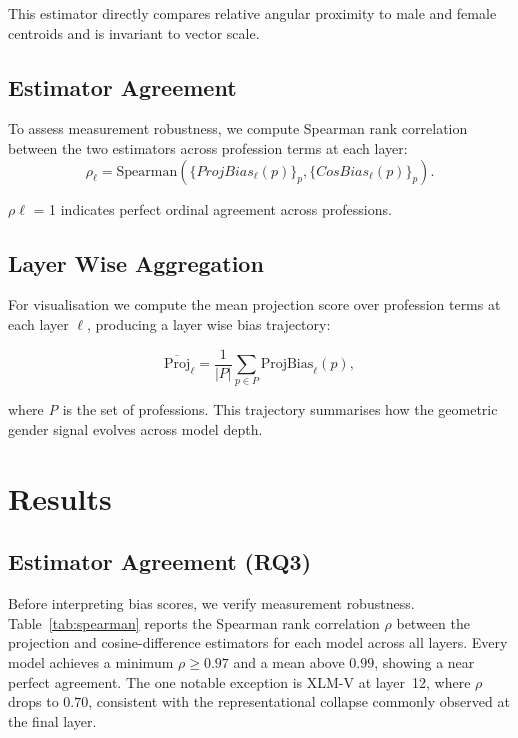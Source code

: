 \documentclass[english, a4paper, 11.5pt, twoside]{article}
\begin{document}
This estimator directly compares relative angular proximity to male and female centroids and is invariant
to vector scale.


\subsection{Estimator Agreement}
To assess measurement robustness, we compute Spearman rank correlation \parencite{Spearman:1904} between the two estimators across profession terms at each layer:
\begin{equation}
\rho_\ell = \text{Spearman}(\{ProjBias_\ell(p)\}_p, \{CosBias_\ell(p)\}_p).
\end{equation}

$\rho\ell$ = 1 indicates perfect ordinal agreement across professions.

\subsection{Layer Wise Aggregation}
For visualisation we compute the mean projection score over profession terms at each layer $\ell$,
producing a layer wise bias trajectory:

\begin{equation}
    \overline{\text{Proj}}_\ell = \frac{1}{|P|} \sum_{p \in P} \text{ProjBias}_\ell(p),
\end{equation}

where \textit{P} is the set of professions. This trajectory summarises how the geometric gender
signal evolves across model depth.


\graphicspath{{figs/}}

\section{Results}\label{section-results}

\subsection{Estimator Agreement (RQ3)}

Before interpreting bias scores, we verify measurement robustness. Table~\ref{tab:spearman} reports the Spearman rank correlation $\rho$ between the projection and cosine-difference estimators for each model across all layers. Every model achieves a minimum $\rho \geq 0.97$ and a mean above $0.99$, showing a near perfect agreement. The one notable exception is XLM-V at layer~12, where $\rho$ drops to $0.70$, consistent with the representational collapse commonly observed at the final layer.
\end{document}
